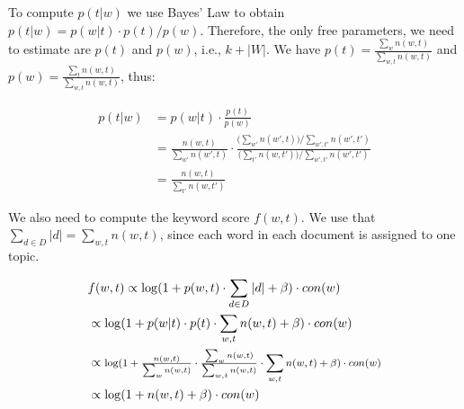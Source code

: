 \documentclass[twocolumn,10]{article}
\begin{document}
	To compute $p(t|w)$ we use Bayes' Law to obtain $p(t|w)=p(w|t)\cdot p(t)/p(w)$. Therefore, the only free parameters, we need to estimate are $p(t)$ and $p(w)$, i.e., $k+|W|$. We have $p(t)=\tfrac{\sum_w n(w,t)}{\sum_{w,t} n(w,t)}$  and $p(w)=\tfrac{\sum_t n(w,t)}{\sum_{w,t} n(w,t)}$, thus: %
	\begin{small}
		\begin{equation}	
		\begin{aligned}	
		p(t|w) &=p(w|t)\cdot \tfrac{p(t)}{p(w)} \\ &= \tfrac{n(w,t)}{\sum_{w'} n(w',t)} \cdot \tfrac{\big(\sum_{w'} n(w',t)\big)/\sum_{w',t'} n(w',t')}{\big(\sum_{t'} n(w,t')\big)/\sum_{w',t'} n(w',t')} \nonumber\\ 
		&= \tfrac{n(w,t)}{\sum_{t'} n(w,t')}\nonumber
		\end{aligned}   \end{equation} 
	\end{small}
	We also need to compute the keyword score $f(w,t)$. We use that $\sum_{d\in D} |d|=\sum_{w,t} n(w,t)$, since each word in each document is assigned to one topic.
		\begin{small}
			\begin{equation}	
			\begin{aligned}	
			&f(w,t)\propto \log(1+p(w,t)\cdot \sum_{d\in D} |d| + \beta)\cdot con(w)\nonumber \\
				&\propto \log(1+p(w|t)\cdot p(t)\cdot \sum_{w,t} n(w,t) + \beta)\cdot con(w) \nonumber\\
				&\propto \text{\footnotesize{$\log(1+\tfrac{n(w,t)}{\sum_{w} n(w,t)}\cdot \tfrac{\sum_w n(w,t)}{\sum_{w,t} n(w,t)} \cdot \sum_{w,t} n(w,t) + \beta)\cdot con(w)$}}\nonumber \\
				&\propto \log(1+n(w,t) + \beta)\cdot con(w)\nonumber \\
			\end{aligned}   \end{equation} 
		\end{small}
\vspace{-15pt}
	
\end{document}
